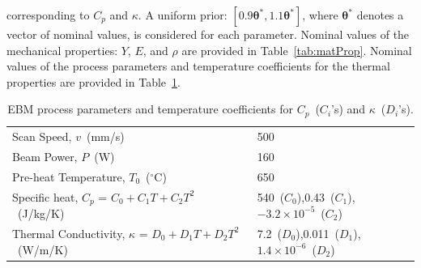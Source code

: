 corresponding to $C_p$ and $\kappa$. A uniform prior: $[0.9\bm{\theta}^\ast, 1.1\bm{\theta}^\ast]$, 
where $\bm{\theta}^\ast$ denotes a vector of nominal values,
is considered for each parameter. Nominal values of the mechanical properties: $Y$, $E$, and $\rho$ are provided
in Table~\ref{tab:matProp}. Nominal values of the process parameters and temperature coefficients for
the thermal properties are provided in Table~\ref{tab:remain}.
%
\begin{table}[htbp]
\centering
\caption{EBM process parameters and temperature coefficients for $C_p$~($C_i$'s) and $\kappa$~($D_i$'s).}
\label{tab:remain}
\vspace{1mm}
\begin{tabular}{ ll }
\toprule
Scan Speed, $v$~(mm/s) & 500 \\
Beam Power, $P$~(W) & 160 \\
Pre-heat Temperature, $T_0$~($^\circ$C) & 650 \\
Specific heat, $C_p$ = $C_0+C_1T+C_2T^2$~(J/kg/K) & 540~($C_0$),0.43~($C_1$),$-3.2\times 10^{-5}$~($C_2$) \\
Thermal Conductivity, $\kappa$ = $D_0+D_1T+D_2T^2$~(W/m/K) & 7.2~($D_0$),0.011~($D_1$),$1.4\times 10^{-6}$~($D_2$) \\
\bottomrule
\end{tabular}
\end{table}

